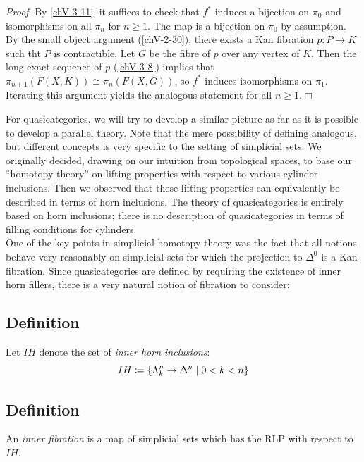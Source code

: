         \emph{Proof}. By \ref{chV-3-11}, it suffices to check that $f^{*}$ induces a bijection on $\pi_0$ and isomorphisms on all $\pi_n$ for $n \geq 1$. The map is a bijection on $\pi_0$ by assumption. By the small object argument (\ref{chV-2-30}), there exists a Kan fibration $p \colon P \to K$ such tht $P$ is contractible. Let $G$ be the fibre of $p$ over any vertex of $K$. Then the long exact sequence of $p$ (\ref{chV-3-8}) implies that $\pi_{n+1}(F(X, K)) \cong \pi_n(F(X, G))$, so $f^{*}$ induces isomorphisms on $\pi_1$. Iterating this argument yields the analogous statement for all $n \geq 1$.\hfill$\Box$
        \medskip

        For quasicategories, we will try to develop a similar picture as far as it is possible to develop a parallel theory. Note that the mere possibility of defining analogous, but different concepts is very specific to the setting of simplicial sets. We originally decided, drawing on our intuition from topological spaces, to base our ``homotopy theory'' on lifting properties with respect to various cylinder inclusions. Then we observed that these lifting properties can equivalently be described in terms of horn inclusions. The theory of quasicategories is entirely based on horn inclusions; there is no description of quasicategories in terms of filling conditions for cylinders.\\
        One of the key points in simplicial homotopy theory was the fact that all notions behave very reasonably on simplicial sets for which the projection to $\Delta^0$ is a Kan fibration. Since quasicategories are defined by requiring the existence of inner horn fillers, there is a very natural notion of fibration to consider:

    \subsection{Definition}\label{chVI-1-2}
        Let $I H$ denote the set of \emph{inner horn inclusions}:
        \begin{equation*}
            I H \coloneq \{ \Lambda^{n}_{k} \to \Delta^n \mid 0 < k < n \} 
        \end{equation*}

    \subsection{Definition}\label{chVI-1-3}
        An \emph{inner fibration} is a map of simplicial sets which has the RLP with respect to $I H$.

